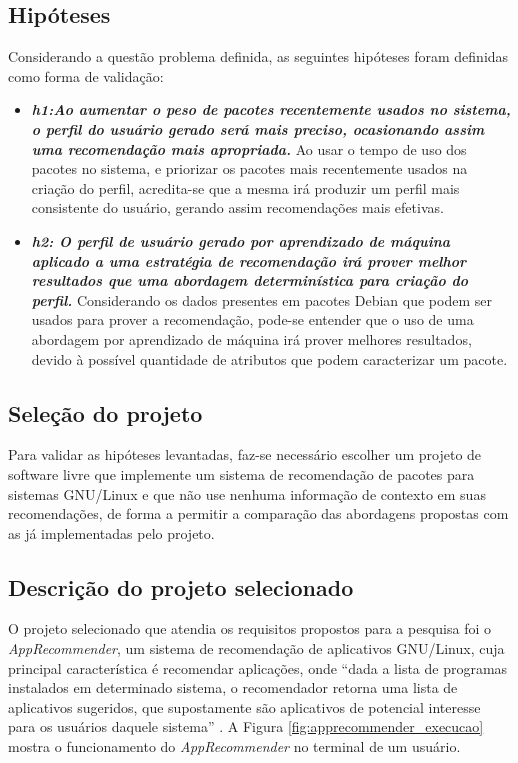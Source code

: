   \subsection{Hipóteses} \label{sec:hipoteses}

  Considerando a questão problema definida, as seguintes hipóteses foram definidas
  como forma de validação:

  \begin{itemize} \item \textit{\textbf{h1:Ao aumentar o peso de pacotes
  recentemente usados no sistema, o perfil do usuário gerado será mais preciso,
  ocasionando assim uma recomendação mais apropriada.}} Ao usar o tempo de uso dos
  pacotes no sistema, e priorizar os pacotes mais recentemente usados na criação
  do perfil, acredita-se que a mesma irá produzir um perfil mais
  consistente do usuário, gerando assim recomendações mais efetivas.\item
  \textit{\textbf{h2: O perfil de usuário gerado por aprendizado de máquina aplicado a uma
  estratégia de recomendação irá prover melhor resultados que uma abordagem
  determinística para criação do perfil.}}
  Considerando os dados presentes em pacotes Debian que podem ser
  usados para prover a recomendação, pode-se entender que o uso de uma abordagem
  por aprendizado de máquina irá prover melhores resultados, devido à possível
  quantidade de atributos que podem caracterizar um pacote.
  \end{itemize}

  \subsection{Seleção do projeto}

  Para validar as hipóteses levantadas, faz-se necessário escolher um projeto de
  software livre que implemente um sistema de recomendação de pacotes
  para sistemas GNU/Linux e que não use nenhuma informação de contexto em suas
  recomendações, de forma a permitir a comparação das abordagens propostas com as
  já implementadas pelo projeto.

  \subsection{Descrição do projeto selecionado}

  O projeto selecionado que atendia os requisitos propostos para a pesquisa foi o
  \textit{AppRecommender}, um sistema de recomendação de aplicativos GNU/Linux,
  cuja principal característica é recomendar aplicações,
  onde “dada a lista de programas instalados em determinado sistema, o recomendador retorna uma lista de aplicativos
  sugeridos, que supostamente são aplicativos de potencial interesse para os usuários daquele sistema”
  \cite{araujo2011apprecommender}. A Figura \ref{fig:apprecommender_execucao}
  mostra o funcionamento do \textit{AppRecommender} no terminal de um usuário.

